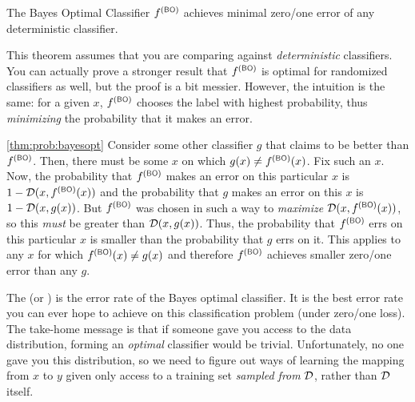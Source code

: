 \begin{theorem} \label{thm:prob:bayesopt}
  The Bayes Optimal Classifier $f\xth{BO}$ achieves minimal zero/one
  error of any deterministic classifier.
\end{theorem}

This theorem assumes that you are comparing against
\emph{deterministic} classifiers.  You can actually prove a stronger
result that $f\xth{BO}$ is optimal for randomized classifiers as well,
but the proof is a bit messier.  However, the intuition is the same:
for a given $x$, $f\xth{BO}$ chooses the label with highest
probability, thus \emph{minimizing} the probability that it makes an
error.

\begin{myproof}{\ref{thm:prob:bayesopt}}
  Consider some other classifier $g$ that claims to be better than
  $f\xth{BO}$.  Then, there must be some $x$ on which $g(x) \neq f\xth{BO}(x)$.  Fix
  such an $x$.  Now, the probability that $f\xth{BO}$ makes an error on this
  particular $x$ is $1 - \cD(x, f\xth{BO}(x))$ and the probability
  that $g$ makes an error on this $x$ is $1 - \mathcal{D}(x, g(x))$.  But
  $f\xth{BO}$ was chosen in such a way to \emph{maximize} $\cD(x,
  f\xth{BO}(x))$, so this \emph{must} be greater than $\mathcal{D}(x, g(x))$.
  Thus, the probability that $f\xth{BO}$ errs on this particular $x$ is
  smaller than the probability that $g$ errs on it.  This applies to
  any $x$ for which $f\xth{BO}(x) \neq g(x)$ and therefore $f\xth{BO}$ achieves
  smaller zero/one error than any $g$.
\end{myproof}

The  (or )
is the error rate of the Bayes optimal classifier.  It is the best
error rate you can ever hope to achieve on this classification problem
(under zero/one loss).
%
The take-home message is that if someone gave you access to the data
distribution, forming an \emph{optimal} classifier would be trivial.
Unfortunately, no one gave you this distribution, so we need to
figure out ways of learning the mapping from $x$ to $y$ given only access to a training set \emph{sampled from} $\mathcal{D}$, rather than $\mathcal{D}$ itself.


